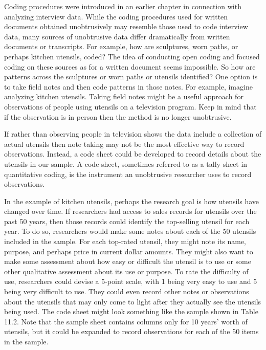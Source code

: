 Coding procedures were introduced in an earlier chapter in connection with analyzing interview data. While the coding procedures used for written documents obtained unobtrusively may resemble those used to code interview data, many sources of unobtrusive data differ dramatically from written documents or transcripts. For example, how are sculptures, worn paths, or perhaps kitchen utensils, coded? The idea of conducting open coding and focused coding on these sources as for a written document seems impossible. So how are patterns across the sculptures or worn paths or utensils identified? One option is to take field notes and then code patterns in those notes. For example, imagine analyzing kitchen utensils. Taking field notes might be a useful approach for observations of people using utensils on a television program. Keep in mind that if the observation is in person then the method is no longer unobtrusive.

If rather than observing people in television shows the data include a collection of actual utensils then note taking may not be the most effective way to record observations. Instead, a code sheet could be developed to record details about the utensils in our sample. A code sheet, sometimes referred to as a tally sheet in quantitative coding, is the instrument an unobtrusive researcher uses to record observations.

In the example of kitchen utensils, perhaps the research goal is how utensils have changed over time. If researchers had access to sales records for utensils over the past 50 years, then those records could identify the top-selling utensil for each year. To do so, researchers would make some notes about each of the 50 utensils included in the sample. For each top-rated utensil, they might note its name, purpose, and perhaps price in current dollar amounts. They might also want to make some assessment about how easy or difficult the utensil is to use or some other qualitative assessment about its use or purpose. To rate the difficulty of use, researchers could devise a 5-point scale, with 1 being very easy to use and 5 being very difficult to use. They could even record other notes or observations about the utensils that may only come to light after they actually see the utensils being used. The code sheet might look something like the sample shown in Table 11.2. Note that the sample sheet contains columns only for 10 years' worth of utensils, but it could be expanded to record observations for each of the 50 items in the sample.

